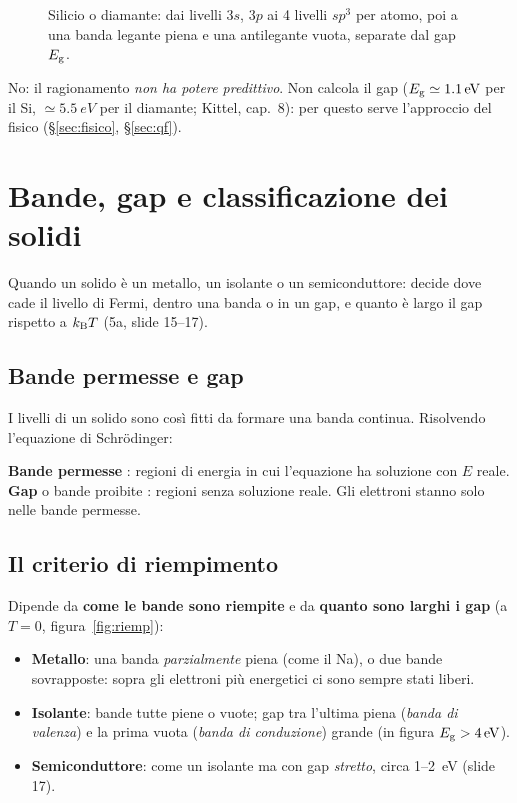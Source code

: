 \documentclass[11pt,a4paper]{article}
\begin{document}
\begin{figure}[tbp]
\centering
{}
\caption{Silicio o diamante: dai livelli $3s$, $3p$ ai 4 livelli $sp^3$ per atomo, poi a una banda legante piena e una antilegante vuota,
separate dal gap $E_{\mathrm g}$.}
\end{figure}

No: il ragionamento \emph{non ha potere predittivo}. Non calcola il gap ($E_{\mathrm g}\simeq\SI{1.1}{eV}$ per il Si, $\simeq\SI{5.5}{eV}$ per il diamante; Kittel,
cap.~8): per questo serve l'approccio del fisico (§\ref{sec:fisico}, §\ref{sec:qf}).

\section{Bande, gap e classificazione dei solidi}\label{sec:classificazione}
Quando un solido è un metallo, un isolante o un semiconduttore: decide dove cade il livello di Fermi, dentro una banda o in un gap, e quanto è largo
il gap rispetto a $k_{\mathrm B} T$ (5a, slide 15--17).

\subsection{Bande permesse e gap}
I livelli di un solido sono così fitti da formare una banda continua. Risolvendo l'equazione di Schrödinger:
\begin{definizione}
\textbf{Bande permesse} : regioni di energia in cui l'equazione ha soluzione con $E$ reale.
\textbf{Gap} o bande proibite : regioni senza soluzione reale.
Gli elettroni stanno solo nelle bande permesse.
\end{definizione}

\subsection{Il criterio di riempimento}
Dipende da \textbf{come le bande sono riempite} e da \textbf{quanto sono larghi i gap} (a $T=0$, figura~\ref{fig:riemp}):
\begin{itemize}[leftmargin=*]
\item \textbf{Metallo}: una banda \emph{parzialmente} piena (come il Na), o due bande sovrapposte: sopra gli elettroni più energetici ci sono
sempre stati liberi.
\item \textbf{Isolante}: bande tutte piene o vuote; gap tra l'ultima piena (\emph{banda di valenza}) e la prima vuota (\emph{banda di conduzione})
grande (in figura $E_{\mathrm g}>\SI{4}{eV}$).
\item \textbf{Semiconduttore}: come un isolante ma con gap \emph{stretto}, circa 1--\SI{2}{eV} (slide 17).
\end{itemize}
\end{document}
